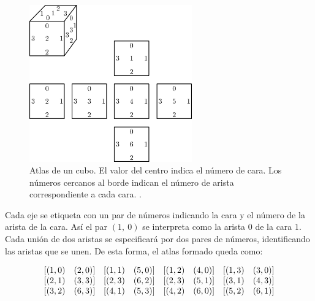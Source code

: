 \begin{figure}[h]
\includegraphics[width=7cm]{Img/GEO/geo-atlas0.jpg}
\centering
\caption{\footnotesize{Atlas de un cubo. El valor del centro indica el número de cara. Los números cercanos al borde indican el número de arista correspondiente a cada cara.
\citep{Ramos2011}.}}
\label{fig:atlascubo}
\end{figure}

Cada eje se etiqueta con un par de números indicando la cara y el número de la arista de la cara. Así el par $(1,\ 0)$ se interpreta como la arista $0$ de la cara $1$. Cada unión de dos aristas se especificará por dos pares de números, identificando las aristas que se unen. De esta forma, el atlas formado queda como:


$$
\begin{array}{c@{}c@{}c@{}c}
 \begin{array}{cc}
         [(1,0) & (2,0)]
  \end{array} & \begin{array}{cc}
         [(1,1) & (5,0)]
  \end{array} & \begin{array}{cc}
         [(1,2) & (4,0)]
  \end{array} &
  \begin{array}{cc}
         [(1,3) & (3,0)] 
  \end{array}
  \\
  \begin{array}{cc}
         [(2,1) & (3,3)]
  \end{array} & \begin{array}{cc}
         [(2,3) & (6,2)]
  \end{array} & \begin{array}{cc}
         [(2,3) & (5,1)] 
  \end{array} &
  \begin{array}{cc}
         [(3,1) & (4,3)]
  \end{array}
  \\
  \begin{array}{cc}
         [(3,2) & (6,3)]
  \end{array} & \begin{array}{cc}
         [(4,1) & (5,3)]
  \end{array} & \begin{array}{cc}
         [(4,2) & (6,0)] 
  \end{array} &
  \begin{array}{cc}
         [(5,2) & (6,1)] 
  \end{array}
\end{array}
$$   

